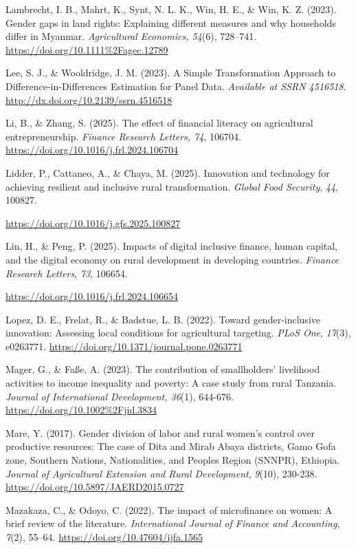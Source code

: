 \documentclass[
]{article}
\begin{document}
Lambrecht, I. B., Mahrt, K., Synt, N. L. K., Win, H. E., \& Win, K. Z.
(2023). Gender gaps in land rights: Explaining different measures and
why households differ in Myanmar. \emph{Agricultural Economics, 54}(6),
728--741. \url{https://doi.org/10.1111\%2Fagec.12789}

Lee, S. J., \& Wooldridge, J. M. (2023). A Simple Transformation
Approach to Difference-in-Differences Estimation for Panel Data.
\emph{Available at SSRN 4516518}.
\href{http://dx.doi.org/10.2139/ssrn.4516518.}{http://dx.doi.org/10.2139/ssrn.4516518}

Li, B., \& Zhang, S. (2025). The effect of financial literacy on
agricultural entrepreneurship. \emph{Finance Research Letters, 74},
106704. \url{https://doi.org/10.1016/j.frl.2024.106704}

Lidder, P., Cattaneo, A., \& Chaya, M. (2025). Innovation and technology
for achieving resilient and inclusive rural transformation. \emph{Global
Food Security}, \emph{44}, 100827.

\url{https://doi.org/10.1016/j.gfs.2025.100827}

Lin, H., \& Peng, P. (2025). Impacts of digital inclusive finance, human
capital, and the digital economy on rural development in developing
countries. \emph{Finance Research Letters}, \emph{73}, 106654.

\url{https://doi.org/10.1016/j.frl.2024.106654}

Lopez, D. E., Frelat, R., \& Badstue, L. B. (2022). Toward
gender-inclusive innovation: Assessing local conditions for agricultural
targeting. \emph{PLoS One}, \emph{17}(3), e0263771.
\url{https://doi.org/10.1371/journal.pone.0263771}

Mager, G., \& Faße, A. (2023). The contribution of smallholders'
livelihood activities to income inequality and poverty: A case study
from rural Tanzania. \emph{Journal of International Development, 36}(1),
644-676. \url{https://doi.org/10.1002\%2Fjid.3834}

Mare, Y. (2017). Gender division of labor and rural women's control over
productive resources: The case of Dita and Mirab Abaya districts, Gamo
Gofa zone, Southern Nations, Nationalities, and Peoples Region (SNNPR),
Ethiopia. \emph{Journal of Agricultural Extension and Rural
Development}, \emph{9}(10), 230-238.
\url{https://doi.org/10.5897/JAERD2015.0727}

Mazakaza, C., \& Odoyo, C. (2022). The impact of microfinance on women:
A brief review of the literature. \emph{International Journal of Finance
and Accounting}, \emph{7}(2), 55--64.
\url{https://doi.org/10.47604/ijfa.1565}
\end{document}
